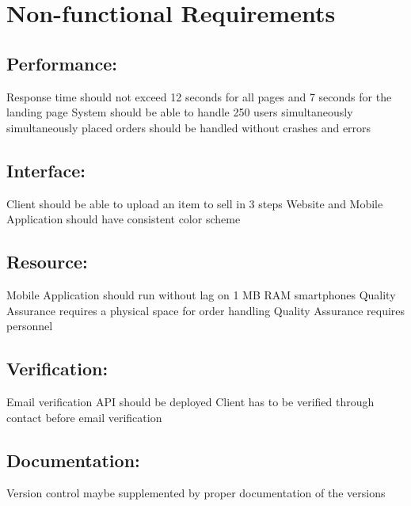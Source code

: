 
\section{Non-functional Requirements}

\subsection*{Performance:}
\begin{outline}
    \1 Response time should not exceed 12 seconds for all pages and 7 seconds for the landing page
    \1 System should be able to handle 250 users simultaneously
     simultaneously placed orders should be handled without crashes and errors
\end{outline}

\subsection*{Interface:}
\begin{outline}
    \1 Client should be able to upload an item to sell in 3 steps
    \1 Website and Mobile Application should have consistent color scheme
\end{outline}

\subsection*{Resource:}
\begin{outline}
    \1 Mobile Application should run without lag on 1 MB RAM smartphones
    \1 Quality Assurance requires a physical space for order handling
    \1 Quality Assurance requires personnel
\end{outline}

\subsection*{Verification:}
\begin{outline}
    \1 Email verification API should be deployed
    \1 Client has to be verified through contact before email verification
\end{outline}

\subsection*{Documentation:}
\begin{outline}
    \1 Version control maybe supplemented by proper documentation of the versions
\end{outline}

